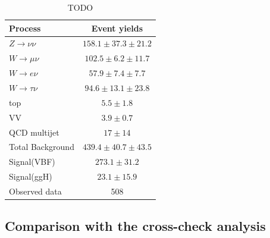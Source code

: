 
\begin{table}[!htb]
\centering
\begin{tabular}{|l|c|}
\hline 
Process & Event yields \\
\hline\hline
$Z\rightarrow\nu\nu$  & $158.1 \pm 37.3 \pm 21.2$ \\
$W\rightarrow\mu\nu$  & $102.5 \pm 6.2  \pm 11.7$ \\
$W\rightarrow e\nu$   & $ 57.9 \pm 7.4  \pm  7.7$ \\
$W\rightarrow\tau\nu$ & $ 94.6 \pm 13.1 \pm 23.8$ \\
top                   & $  5.5 \pm 1.8$           \\
VV                    & $  3.9 \pm 0.7$           \\
QCD multijet          & $ 17   \pm 14$            \\
\hline\hline
Total Background      & $439.4 \pm 40.7 \pm 43.5$ \\
\hline\hline
Signal(VBF)           & $273.1 \pm 31.2 $         \\
Signal(ggH)           & $ 23.1 \pm 15.9 $         \\
\hline\hline
Observed data         & 508                       \\
\hline
\end{tabular}
\caption{TODO \cite{ARTICLE:CMSVBFHiggsInvisibleParkedAnalysisPAS}}
\label{TABLE:ParkedDataAnalysis_Results_Summary}
\end{table}

\subsection{Comparison with the cross-check analysis}


